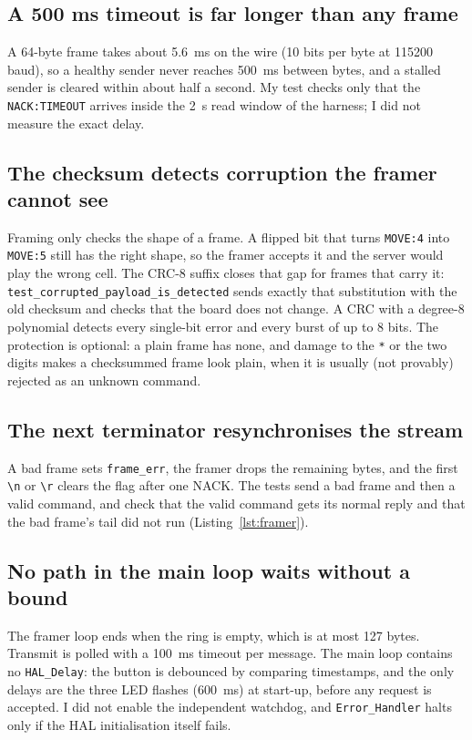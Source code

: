 \subsection{A 500 ms timeout is far longer than any frame}
A 64-byte frame takes about 5.6~ms on the wire (10 bits per byte at 115200
baud), so a healthy sender never reaches 500~ms between bytes, and a stalled
sender is cleared within about half a second. My test checks only that the
\texttt{NACK:TIMEOUT} arrives inside the 2~s read window of the harness; I did
not measure the exact delay.

\subsection{The checksum detects corruption the framer cannot see}
Framing only checks the shape of a frame. A flipped bit that turns \texttt{MOVE:4}
into \texttt{MOVE:5} still has the right shape, so the framer accepts it and the
server would play the wrong cell. The CRC-8 suffix closes that gap for frames that
carry it: \texttt{test\_corrupted\_payload\_is\_detected} sends exactly that
substitution with the old checksum and checks that the board does not change. A CRC
with a degree-8 polynomial detects every single-bit error and every burst of up to
8 bits. The protection is optional: a plain frame has none, and damage to the
\texttt{*} or the two digits makes a checksummed frame look plain, when it is
usually (not provably) rejected as an unknown command.

\subsection{The next terminator resynchronises the stream}
A bad frame sets \texttt{frame\_err}, the framer drops the remaining bytes,
and the first \texttt{\textbackslash n} or \texttt{\textbackslash r} clears the flag
after one NACK. The tests send a bad frame and then a valid command, and
check that the valid command gets its normal reply and that the bad frame's
tail did not run (Listing~\ref{lst:framer}).

\subsection{No path in the main loop waits without a bound}
The framer loop ends when the ring is empty, which is at most 127 bytes. Transmit
is polled with a 100~ms timeout per message. The main loop contains no
\texttt{HAL\_Delay}: the button is debounced by comparing timestamps, and the only
delays are the three LED flashes (600~ms) at start-up, before any request is
accepted. I did not enable the independent watchdog, and
\texttt{Error\_Handler} halts only if the HAL initialisation itself fails.
